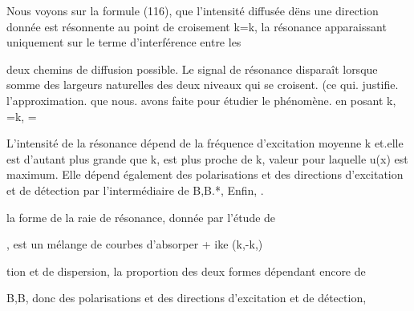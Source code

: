 Nous voyons sur la formule (116), que l'intensité diffusée
dëns une direction donnée est résonnente au point de croisement k=k,
la résonance apparaissant uniquement sur le terme d'interférence entre les

deux chemins de diffusion possible. Le signal de résonance disparaît lorsque
 somme des largeurs naturelles des deux niveaux qui se
croisent. (ce qui. justifie. l'approximation. que nous. avons faite pour étudier
le phénomène. en posant k, =k, = %

L'intensité de la résonance dépend de la fréquence d'excitation
moyenne k et.elle est d'autant plus grande que k, est plus proche de k, valeur
pour laquelle u(x) est maximum. Elle dépend également des polarisations et des
directions d'excitation et de détection par l'intermédiaire de B,B.*, Enfin, .

la forme de la raie de résonance, donnée par l'étude de

, est un mélange de courbes d'absorper + ike (k,-k,)

tion et de dispersion, la proportion des deux formes dépendant encore de

B,B, donc des polarisations et des directions d'excitation et de détection,

